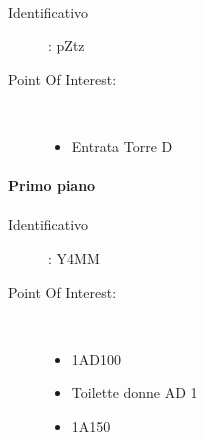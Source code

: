 \documentclass[../SperimentazioniPratiche.tex]{subfiles}
\begin{document}
			\paragraph*{}
			\label{00003}
			\begin{tcolorbox}[fonttitle=\bfseries, 
								adjusted title={\Large Beacon 00003},
								sharp corners=south,
								colback=white, 
								colframe=white!50!blue!75!black]
								
				\begin{description}%
					\item[Identificativo]: pZtz

					\tcbline					
					
					\item[Point Of Interest:] \ \par
					\begin{itemize}
						\item Entrata Torre D
					\end{itemize}					   				
				\end{description}  				
			\end{tcolorbox}
			

			
		\paragraph{Primo piano}			
			
			\paragraph*{}
			\label{01000}
			\begin{tcolorbox}[fonttitle=\bfseries, 
								adjusted title={\Large Beacon 01000},
								sharp corners=south,
								colback=white, 
								colframe=white!50!blue!75!black]
								
				\begin{description}
					\item[Identificativo]: Y4MM

					\tcbline					
					
					\item[Point Of Interest:] \ \par
					\begin{itemize}
						\item 1AD100
						\item Toilette donne AD 1
						\item 1A150
					\end{itemize}					   				
				\end{description}  				
			\end{tcolorbox}
			
\end{document}
